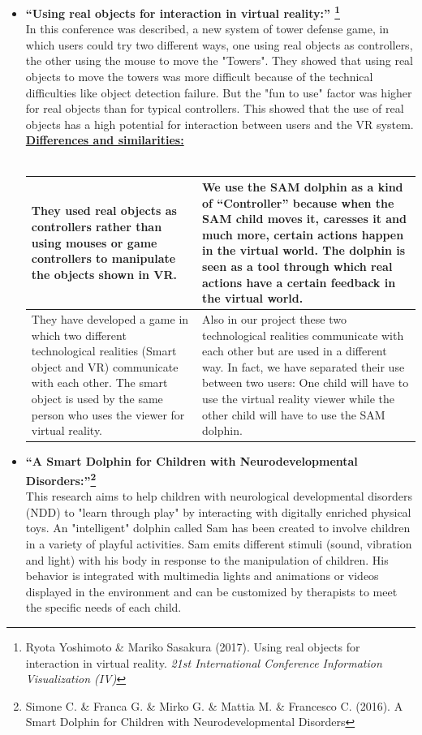 \documentclass [12pt]{article}
\begin{document}
\begin{itemize}[•]
\item \textbf{``Using real objects for interaction in virtual reality:'' \footnote{Ryota Yoshimoto \& Mariko Sasakura (2017). Using real objects for interaction in virtual reality. \textit{21st International Conference Information Visualization (IV)}}}\\ 
In this conference was described, a new system of tower defense game, in which users could try two different ways, one using real objects as controllers, the other using the mouse to move the "Towers". They showed that using real objects to move the towers was more difficult because of the technical difficulties like object detection failure.  But the "fun to use" factor was higher for real objects than for typical controllers. This showed that the use of real objects has a high potential for interaction between users and the VR system.\\
 \underline{\textbf{Differences and similarities:}}\\\\
 \begin{tabular}{|p{7cm}|p{7cm}|}
\hline
 They used real objects as controllers rather than using mouses or game controllers to manipulate the objects shown in VR. & We use the SAM dolphin as a kind of “Controller” because when the SAM child moves it, caresses it and much more, certain actions happen in the virtual world. The dolphin is seen as a tool through which real actions have a certain feedback in the virtual world.\\
\hline
They have developed a game in which two different technological realities (Smart object and VR) communicate with each other. The smart object is used by the same person who uses the viewer for virtual reality.  & Also in our project these two technological realities communicate with each other but are used in a different way. In fact, we have separated their use between two users: One child will have to use the virtual reality viewer while the other child will have to use the SAM dolphin.\\
\hline
\end{tabular}
\clearpage
\item \textbf{``A Smart Dolphin for Children with Neurodevelopmental Disorders:''\footnote{Simone C. \& Franca G. \& Mirko G. \& Mattia M. \& Francesco C. (2016). A Smart Dolphin for Children with Neurodevelopmental Disorders}}\\ 
This research aims to help children with neurological developmental disorders (NDD) to "learn through play" by interacting with digitally enriched physical toys. An "intelligent" dolphin called Sam has been created to involve children in a variety of playful activities. Sam emits different stimuli (sound, vibration and light) with his body in response to the manipulation of children. His behavior is integrated with multimedia lights and animations or videos displayed in the environment and can be customized by therapists to meet the specific needs of each child.\\

\end{itemize}
\end{document}
